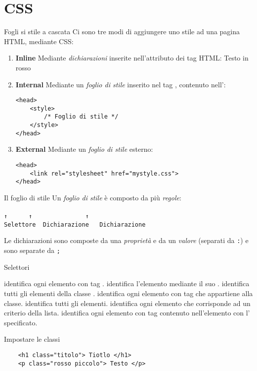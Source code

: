 \section{CSS}
\begin{frame}[fragile]{Fogli si stile a cascata}\transfade\centering
  Ci sono tre modi di aggiungere uno stile ad una pagina HTML, mediante CSS:
  \begin{enumerate}[<+(1)->]
    \item \textbf{Inline} Mediante \emph{dichiarazioni} inserite nell'attributo  dei tag HTML:
     {\color{red}Testo in rosso}
    \item \textbf{Internal} Mediante un \emph{foglio di stile} inserito nel tag , contenuto nell':
    \begin{verbatim}
<head>
    <style>
        /* Foglio di stile */
    </style>
</head>
    \end{verbatim}
    \item \textbf{External} Mediante un \emph{foglio di stile} esterno:
    \begin{verbatim}
<head>
    <link rel="stylesheet" href="mystyle.css">
</head>
    \end{verbatim}
  \end{enumerate}
\end{frame}

\begin{frame}[fragile]{Il foglio di stile}\transfade\centering
  Un \emph{foglio di stile} è composto da più \emph{regole}:\\\medskip
     \\
      \texttt{↑~~~~~~↑~~~~~~~~~~~~~~~↑~~~~~~}\\
\texttt{Selettore~~Dichiarazione~~~Dichiarazione~~}\par\bigskip
  Le dichiarazioni sono composte da una \emph{proprietà} e da un \emph{valore} (separati da \texttt{:}) e sono separate da \texttt{;}\\
\end{frame}

\begin{frame}[fragile]{Selettori}\transfade\centering
  \begin{description}[<+->]
    \itemtt[\mintcss{p}] identifica ogni elemento con tag .
    \itemtt[\#id] identifica l'elemento mediante il suo .
     identifica tutti gli elementi della classe .
     identifica ogni elemento con tag  che appartiene alla classe.
    \itemtt[*] identifica tutti gli elementi.
     identifica ogni elemento che corrisponde ad un criterio della lista.
    \itemtt[\#id \mintcss{p}] identifica ogni elemento con tag  contenuto nell'elemento con l' specificato.
  \end{description}
\end{frame}

\begin{frame}[fragile]{Impostare le classi}\transfade\centering
  \begin{verbatim}
    <h1 class="titolo"> Tiotlo </h1>
    <p class="rosso piccolo"> Testo </p>
  \end{verbatim}
\end{frame}